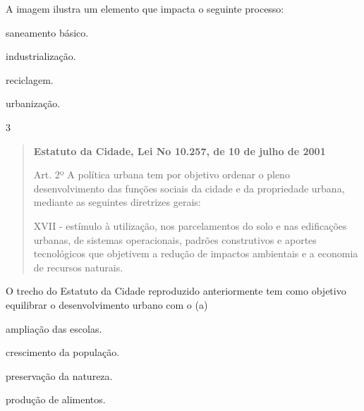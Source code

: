 A imagem ilustra um elemento que impacta o seguinte processo:

\begin{minipage}{.5\textwidth}
\begin{escolha}
\item saneamento básico.

\item industrialização.

\item reciclagem.

\item urbanização.
\end{escolha}
\end{minipage}

\num{3}

\begin{quote}
\textbf{Estatuto da Cidade, Lei No 10.257, de 10 de julho de 2001}

Art. 2º A política urbana tem por objetivo
ordenar o pleno desenvolvimento das funções sociais da cidade e da
propriedade urbana, mediante as seguintes diretrizes gerais:

XVII - estímulo à utilização, nos parcelamentos do solo e nas
edificações urbanas, de sistemas operacionais, padrões construtivos e
aportes tecnológicos que objetivem a redução de impactos ambientais e a
economia de recursos naturais.

\end{quote}

O trecho do Estatuto da Cidade reproduzido anteriormente tem como objetivo
equilibrar o desenvolvimento urbano com o (a)

\begin{minipage}{.5\textwidth}
\begin{escolha}
\item ampliação das escolas.

\item crescimento da população.

\item preservação da natureza.

\item produção de alimentos.
\end{escolha}
\end{minipage}

